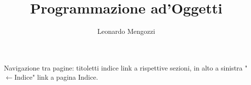 \documentclass{article}
\title{Programmazione ad'Oggetti}
\author{Leonardo Mengozzi}
\date{}
\begin{document}
	\maketitle

	\begin{center}
		\tiny Navigazione tra pagine: titoletti indice link a rispettive sezioni, in alto a sinistra "$\leftarrow$Indice" link a pagina Indice.
	\end{center}

	\tableofcontents\label{toc}

	
	
\end{document}
